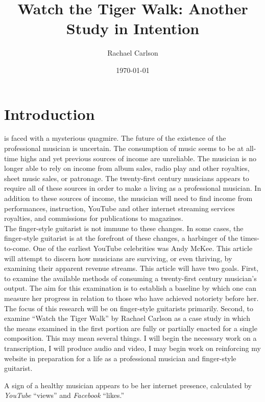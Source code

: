 \documentclass[nofonts,nobib]{tufte-handout}
\title{Watch the Tiger Walk: Another Study in Intention}
\author{Rachael Carlson}
\date{\today}
\begin{document}
\maketitle

\section{Introduction}
 is faced with a mysterious quagmire. The future of the existence of the professional musician is uncertain. The consumption of music seems to be at all-time highs and yet previous sources of income are unreliable. The musician is no longer able to rely on income from album sales, radio play and other royalties, sheet music sales, or patronage. The twenty-first century musicians appears to require all of these sources in order to make a living as a professional musician. In addition to these sources of income, the musician will need to find income from performances, instruction, YouTube and other internet streaming services royalties, and commissions for publications to magazines. \\

The finger-style guitarist is not immune to these changes. In some cases, the finger-style guitarist is at the forefront of these changes, a harbinger of the times-to-come. One of the earliest YouTube celebrities was Andy McKee. This article will attempt to discern how musicians are surviving, or even thriving, by examining their apparent revenue streams. This article will have two goals. First, to examine the available methods of consuming a twenty-first century musician's output. The aim for this examination is to establish a baseline by which one can measure her progress in relation to those who have achieved notoriety before her. The focus of this research will be on finger-style guitarists primarily.  Second, to examine ``Watch the Tiger Walk'' by Rachael Carlson as a case study in which the means examined in the first portion are fully or partially enacted for a single composition. This may mean several things. I will begin the necessary work on a transcription, I will produce audio and video, I may begin work on reinforcing my website in preparation for a life as a professional musician and finger-style guitarist.

A sign of a healthy musician appears to be her internet presence, calculated by \emph{YouTube} ``views'' and \emph{Facebook} ``likes.''
\end{document}
